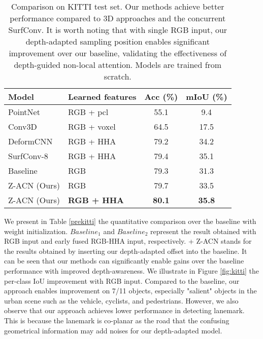 \documentclass[lettersize,journal]{IEEEtran}
\begin{document}
\begin{table}[t]
\centering
\caption{Comparison on KITTI test set. Our methods achieve better performance compared to 3D approaches and the concurrent SurfConv. It is worth noting that with single RGB input, our depth-adapted sampling position enables significant improvement over our baseline, validating the effectiveness of depth-guided non-local attention. Models are trained from scratch.}
\begin{tabular}[ht]{p{2cm}| p{2.2cm} c c  }
\hline

\hline
Model & Learned features & Acc (\%)  & mIoU (\%) \\
\hline
PointNet \cite{Qi2017pointnet} &  RGB + pcl &55.1 & 9.4\\
Conv3D \cite{tchapmi2017segcloud,song2017semantic} & RGB + voxel &  64.5 & 17.5\\ 
DeformCNN \cite{dai2017deformable} &  RGB + HHA & 79.2& 34.2 \\
SurfConv-8 \cite{chu2018surfconv} & RGB + HHA & 79.4& 35.1 \\
\hline
\hline
Baseline & RGB &  79.3   & 31.3  \\
Z-ACN (Ours)  & RGB&  79.7   & 33.5  \\
Z-ACN (Ours)& \textbf{RGB + HHA} &  \textbf{80.1}  & \textbf{35.8} \\
\hline

\hline
\end{tabular}

\label{scratchkitti}
\end{table}

We present in Table \ref{prekitti} the quantitative comparison over the baseline with weight initialization. $Baseline_1$ and $Baseline_2$ represent the result obtained with RGB input and early fused RGB-HHA input, respectively. + Z-ACN stands for the results obtained by inserting our depth-adapted offset into the baseline. It can be seen that our methods can significantly enable gains over the baseline performance with improved depth-awareness. We illustrate in Figure \ref{fig:kitti} the per-class IoU improvement with RGB input. Compared to the baseline, our approach enables improvement on 7/11 objects, especially "salient" objects in the urban scene such as the vehicle, cyclists, and pedestrians. However, we also observe that our approach achieves lower performance in detecting lanemark. This is because the lanemark is co-planar as the road that the confusing geometrical information may add noises for our depth-adapted model.
\end{document}
